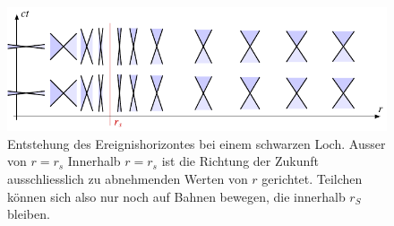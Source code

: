%
%
%
\begin{figure}
\centering
\includegraphics{chapters/110-kruemmung/images/sl.pdf}
\caption{Entstehung des Ereignishorizontes bei einem schwarzen Loch.
Ausser von $r=r_s$ 
Innerhalb $r=r_s$ ist die Richtung der Zukunft ausschliesslich zu
abnehmenden Werten von $r$ gerichtet.
Teilchen können sich also nur noch auf Bahnen bewegen, die innerhalb
$r_S$ bleiben.
\label{buch:kruemmung:schwarzesloch:fig:sl}}
\end{figure}

